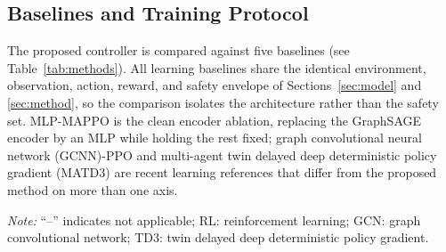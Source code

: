 \documentclass[lettersize,journal]{IEEEtran}
\begin{document}
	
	
	\subsection{Baselines and Training Protocol}
	\label{sec:casestudy:training}
	
	The proposed controller is compared against five baselines (see Table~\ref{tab:methods}). All learning baselines share the identical environment, observation, action, reward, and safety envelope of Sections~\ref{sec:model} and \ref{sec:method}, so the comparison isolates the architecture rather than the safety set. MLP-MAPPO is the clean encoder ablation, replacing the GraphSAGE encoder by an MLP while holding the rest fixed; graph convolutional neural network (GCNN)-PPO and multi-agent twin delayed deep deterministic policy gradient (MATD3) are recent learning references that differ from the proposed method on more than one axis.
	
	
	
	
	
	\begin{table}[!t]
		\caption{Baselines and the component isolated by each method.}
		\label{tab:methods}
		\centering
		\footnotesize
		
		
		\vspace{2pt}
		\parbox{\linewidth}{%
			\scriptsize
			\raggedright
			\textit{Note:} ``--'' indicates not applicable;
			RL: reinforcement learning;
			GCN: graph convolutional network;
			TD3: twin delayed deep deterministic policy gradient.
		}
		
	\end{table}
	
\end{document}
